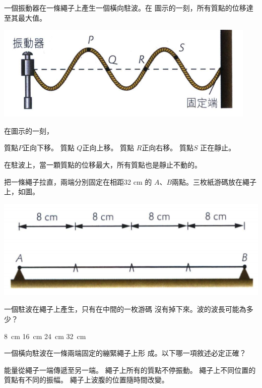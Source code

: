 {
    一個振動器在一條繩子上產生一個橫向駐波。在 圖示的一刻，所有質點的位移達至其最大值。
    \par{\par\centering\includegraphics[width=.4\textwidth]{./img/ch3_earlyclass_wave_mc_2024-05-14-10-05-41.png}\par}
    在圖示的一刻，
    \begin{tasks}
        \task 質點$P$正向下移。
        \task 質點 $Q$正向上移。
        \task 質點 $R$正向右移。
        \task 質點$S$ 正在靜止。
    \end{tasks}

}{
    在駐波上，當一顆質點的位移最大，所有質點也是靜止不動的。
}

{
    把一條繩子拉直，兩端分別固定在相距32 cm 的 $A$、$B$兩點。三枚紙游碼放在繩子上，如圖。
    \par{\par\centering\includegraphics[width=.4\textwidth]{./img/ch3_earlyclass_wave_mc_2024-05-14-10-08-15.png}\par}
    一個駐波在繩子上產生，只有在中間的一枚游碼 沒有掉下來。波的波長可能為多少？
    \begin{tasks}
        \task \qty{8}{cm}
        \task \qty{16}{cm}
        \task \qty{24}{cm}
        \task \qty{32}{cm}
    \end{tasks}

}{}

{
    一個橫向駐波在一條兩端固定的繃緊繩子上形 成。以下哪一項敘述必定正確？
    \begin{tasks}
        \task 能量從繩子一端傳遞至另一端。
        \task 繩子上所有的質點不停振動。
        \task 繩子上不同位置的質點有不同的振幅。
        \task 繩子上波腹的位置隨時間改變。
    \end{tasks}

}{
}

